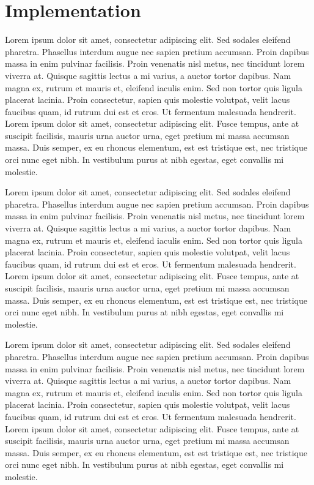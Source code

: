 \section{Implementation}
Lorem ipsum dolor sit amet, consectetur adipiscing elit. Sed sodales
eleifend pharetra. Phasellus interdum augue nec sapien pretium accumsan.
Proin dapibus massa in enim pulvinar facilisis. Proin venenatis nisl metus,
nec tincidunt lorem viverra at. Quisque sagittis lectus a mi varius, a
auctor tortor dapibus. Nam magna ex, rutrum et mauris et, eleifend iaculis
enim. Sed non tortor quis ligula placerat lacinia. Proin consectetur, sapien
quis molestie volutpat, velit lacus faucibus quam, id rutrum dui est et
eros. Ut fermentum malesuada hendrerit. Lorem ipsum dolor sit amet,
consectetur adipiscing elit. Fusce tempus, ante at suscipit facilisis,
mauris urna auctor urna, eget pretium mi massa accumsan massa. Duis semper,
ex eu rhoncus elementum, est est tristique est, nec tristique orci nunc eget
nibh. In vestibulum purus at nibh egestas, eget convallis mi molestie.

Lorem ipsum dolor sit amet, consectetur adipiscing elit. Sed sodales
eleifend pharetra. Phasellus interdum augue nec sapien pretium accumsan.
Proin dapibus massa in enim pulvinar facilisis. Proin venenatis nisl metus,
nec tincidunt lorem viverra at. Quisque sagittis lectus a mi varius, a
auctor tortor dapibus. Nam magna ex, rutrum et mauris et, eleifend iaculis
enim. Sed non tortor quis ligula placerat lacinia. Proin consectetur, sapien
quis molestie volutpat, velit lacus faucibus quam, id rutrum dui est et
eros. Ut fermentum malesuada hendrerit. Lorem ipsum dolor sit amet,
consectetur adipiscing elit. Fusce tempus, ante at suscipit facilisis,
mauris urna auctor urna, eget pretium mi massa accumsan massa. Duis semper,
ex eu rhoncus elementum, est est tristique est, nec tristique orci nunc eget
nibh. In vestibulum purus at nibh egestas, eget convallis mi molestie.

Lorem ipsum dolor sit amet, consectetur adipiscing elit. Sed sodales
eleifend pharetra. Phasellus interdum augue nec sapien pretium accumsan.
Proin dapibus massa in enim pulvinar facilisis. Proin venenatis nisl metus,
nec tincidunt lorem viverra at. Quisque sagittis lectus a mi varius, a
auctor tortor dapibus. Nam magna ex, rutrum et mauris et, eleifend iaculis
enim. Sed non tortor quis ligula placerat lacinia. Proin consectetur, sapien
quis molestie volutpat, velit lacus faucibus quam, id rutrum dui est et
eros. Ut fermentum malesuada hendrerit. Lorem ipsum dolor sit amet,
consectetur adipiscing elit. Fusce tempus, ante at suscipit facilisis,
mauris urna auctor urna, eget pretium mi massa accumsan massa. Duis semper,
ex eu rhoncus elementum, est est tristique est, nec tristique orci nunc eget
nibh. In vestibulum purus at nibh egestas, eget convallis mi molestie.

